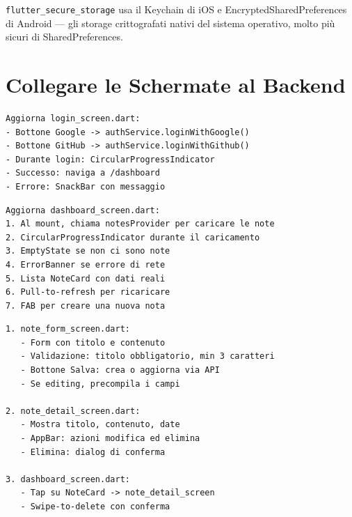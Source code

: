 \begin{notebox}
\texttt{flutter\_secure\_storage} usa il Keychain di iOS e EncryptedSharedPreferences di Android --- gli storage crittografati nativi del sistema operativo, molto più sicuri di SharedPreferences.
\end{notebox}

\section{Collegare le Schermate al Backend}

\begin{praticabox}[title={Pratica --- Login funzionante}]
\begin{lstlisting}[language={}]
Aggiorna login_screen.dart:
- Bottone Google -> authService.loginWithGoogle()
- Bottone GitHub -> authService.loginWithGithub()
- Durante login: CircularProgressIndicator
- Successo: naviga a /dashboard
- Errore: SnackBar con messaggio
\end{lstlisting}
\end{praticabox}

\begin{praticabox}[title={Pratica --- Dashboard con dati reali}]
\begin{lstlisting}[language={}]
Aggiorna dashboard_screen.dart:
1. Al mount, chiama notesProvider per caricare le note
2. CircularProgressIndicator durante il caricamento
3. EmptyState se non ci sono note
4. ErrorBanner se errore di rete
5. Lista NoteCard con dati reali
6. Pull-to-refresh per ricaricare
7. FAB per creare una nuova nota
\end{lstlisting}
\end{praticabox}

\begin{praticabox}[title={Pratica --- CRUD completo}]
\begin{lstlisting}[language={}]
1. note_form_screen.dart:
   - Form con titolo e contenuto
   - Validazione: titolo obbligatorio, min 3 caratteri
   - Bottone Salva: crea o aggiorna via API
   - Se editing, precompila i campi

2. note_detail_screen.dart:
   - Mostra titolo, contenuto, date
   - AppBar: azioni modifica ed elimina
   - Elimina: dialog di conferma

3. dashboard_screen.dart:
   - Tap su NoteCard -> note_detail_screen
   - Swipe-to-delete con conferma
\end{lstlisting}
\end{praticabox}

